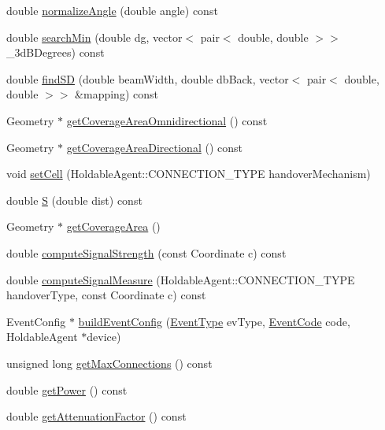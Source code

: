 \begin{DoxyCompactItemize}
double \hyperlink{class_antenna_a353ae3aafbc75033c30fb96004c2b73f}{normalize\+Angle} (double angle) const
\item 
double \hyperlink{class_antenna_a48ef89b0d1bd313bae4ca863da1cc77e}{search\+Min} (double dg, vector$<$ pair$<$ double, double $>$$>$ \+\_\+3d\+B\+Degrees) const
\item 
double \hyperlink{class_antenna_affb34fcbb958e09bd48a2c3069e06ac8}{find\+SD} (double beam\+Width, double db\+Back, vector$<$ pair$<$ double, double $>$$>$ \&mapping) const
\item 
Geometry $\ast$ \hyperlink{class_antenna_a24f459b9915a64fe140af16a2970a7e7}{get\+Coverage\+Area\+Omnidirectional} () const
\item 
Geometry $\ast$ \hyperlink{class_antenna_afa9076da40bdebf6b80c582657e6ce48}{get\+Coverage\+Area\+Directional} () const
\item 
void \hyperlink{class_antenna_ae44355f1ba577a3129788b507c217dba}{set\+Cell} (Holdable\+Agent\+::\+C\+O\+N\+N\+E\+C\+T\+I\+O\+N\+\_\+\+T\+Y\+PE handover\+Mechanism)
\item 
double \hyperlink{class_antenna_a5715c4100035c58d63b7c9a0195748fe}{S} (double dist) const
\item 
Geometry $\ast$ \hyperlink{class_antenna_a5f94dd903add1b59957514887388bd52}{get\+Coverage\+Area} ()
\item 
double \hyperlink{class_antenna_ac33fe5654d4e3307a4c1c155b0f89128}{compute\+Signal\+Strength} (const Coordinate c) const
\item 
double \hyperlink{class_antenna_a2fab50e7dbe01acec58d7fe89798e9b6}{compute\+Signal\+Measure} (Holdable\+Agent\+::\+C\+O\+N\+N\+E\+C\+T\+I\+O\+N\+\_\+\+T\+Y\+PE handover\+Type, const Coordinate c) const
\item 
Event\+Config $\ast$ \hyperlink{class_antenna_aa657d5e0bb29cf0d44ebb614e56fed2a}{build\+Event\+Config} (\hyperlink{_event_type_8h_a2628ea8d12e8b2563c32f05dc7fff6fa}{Event\+Type} ev\+Type, \hyperlink{_event_code_8h_a080ee5c80bcb8b9f3fda41b5e4eb0ef8}{Event\+Code} code, Holdable\+Agent $\ast$device)
\item 
unsigned long \hyperlink{class_antenna_ac7d42215283cd7d4dc16d449f61af91d}{get\+Max\+Connections} () const
\item 
double \hyperlink{class_antenna_afca01d00c8e393ee911f1e9240b51d2e}{get\+Power} () const
\item 
double \hyperlink{class_antenna_a9551ed22d25c51210913de4a3074d9eb}{get\+Attenuation\+Factor} () const
\item 

\end{DoxyCompactItemize}
